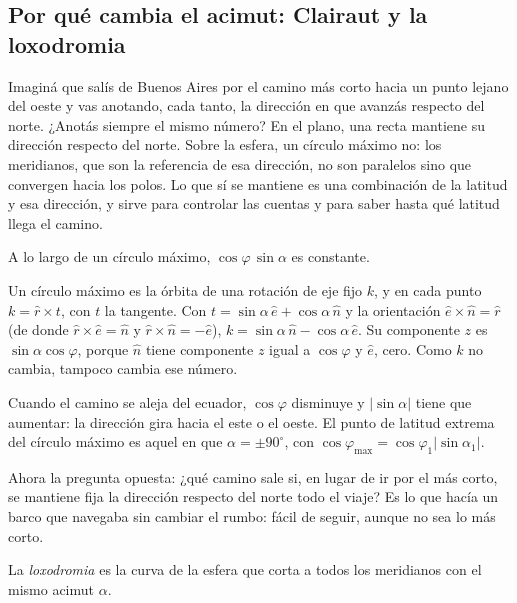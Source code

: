 \subsection{Por qué cambia el acimut: Clairaut y la loxodromia}

Imaginá que salís de Buenos Aires por el camino más corto hacia un punto lejano del oeste y
vas anotando, cada tanto, la dirección en que avanzás respecto del norte. ¿Anotás siempre el
mismo número? En el plano, una recta mantiene su dirección respecto del norte. Sobre la esfera, un círculo máximo no:
los meridianos, que son la referencia de esa dirección, no son paralelos sino que convergen hacia los
polos. Lo que sí se mantiene es una combinación de la latitud y esa dirección, y sirve para
controlar las cuentas y para saber hasta qué latitud llega el camino.

\begin{proposicion}\label{prop:clairaut}
A lo largo de un círculo máximo, \(\cos\varphi\,\sin\alpha\) es constante.
\end{proposicion}

\begin{demostracion}
Un círculo máximo es la órbita de una rotación de eje fijo \(k\), y en cada punto
\(k=\hat r\times t\), con \(t\) la tangente. Con \(t=\sin\alpha\,\hat e+\cos\alpha\,\hat n\) y
la orientación \(\hat e\times\hat n=\hat r\) (de donde \(\hat r\times\hat e=\hat n\) y
\(\hat r\times\hat n=-\hat e\)), \(k=\sin\alpha\,\hat n-\cos\alpha\,\hat e\). Su componente
\(z\) es \(\sin\alpha\cos\varphi\), porque \(\hat n\) tiene componente \(z\) igual a
\(\cos\varphi\) y \(\hat e\), cero. Como \(k\) no cambia, tampoco cambia ese número.
\end{demostracion}

Cuando el camino se aleja del ecuador, \(\cos\varphi\) disminuye y \(|\sin\alpha|\) tiene que
aumentar: la dirección gira hacia el este o el oeste. El punto de latitud extrema del círculo
máximo es aquel en que \(\alpha=\pm90^\circ\), con \(\cos\varphi_{\max}=\cos\varphi_1|\sin\alpha_1|\).

Ahora la pregunta opuesta: ¿qué camino sale si, en lugar de ir por el más corto, se mantiene
fija la dirección respecto del norte todo el viaje? Es lo que hacía un barco que navegaba sin
cambiar el rumbo: fácil de seguir, aunque no sea lo más corto.

\begin{definicion}[Loxodromia]
La \emph{loxodromia} es la curva de la esfera que corta a todos los meridianos con el mismo
acimut \(\alpha\).
\end{definicion}

